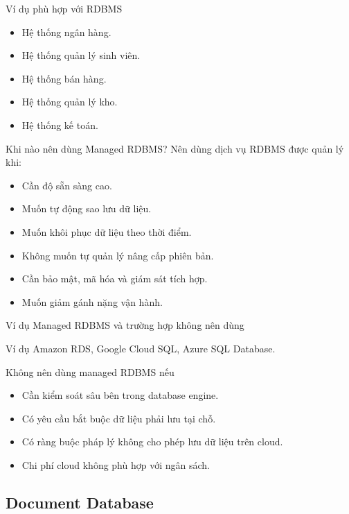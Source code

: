 \documentclass[aspectratio=169,11pt]{beamer}
\newcommand{\smallitem}{\setlength{\itemsep}{2pt}\setlength{\parskip}{0pt}}
\begin{document}
\begin{frame}{Ví dụ phù hợp với RDBMS}
\begin{itemize}
  \smallitem
  \item Hệ thống ngân hàng.
  \item Hệ thống quản lý sinh viên.
  \item Hệ thống bán hàng.
  \item Hệ thống quản lý kho.
  \item Hệ thống kế toán.
\end{itemize}
\end{frame}

\begin{frame}{Khi nào nên dùng Managed RDBMS?}
Nên dùng dịch vụ RDBMS được quản lý khi:
\begin{itemize}
  \smallitem
  \item Cần độ sẵn sàng cao.
  \item Muốn tự động sao lưu dữ liệu.
  \item Muốn khôi phục dữ liệu theo thời điểm.
  \item Không muốn tự quản lý nâng cấp phiên bản.
  \item Cần bảo mật, mã hóa và giám sát tích hợp.
  \item Muốn giảm gánh nặng vận hành.
\end{itemize}
\end{frame}

\begin{frame}{Ví dụ Managed RDBMS và trường hợp không nên dùng}
\begin{block}{Ví dụ}
Amazon RDS, Google Cloud SQL, Azure SQL Database.
\end{block}

\begin{alertblock}{Không nên dùng managed RDBMS nếu}
\begin{itemize}
  \smallitem
  \item Cần kiểm soát sâu bên trong database engine.
  \item Có yêu cầu bắt buộc dữ liệu phải lưu tại chỗ.
  \item Có ràng buộc pháp lý không cho phép lưu dữ liệu trên cloud.
  \item Chi phí cloud không phù hợp với ngân sách.
\end{itemize}
\end{alertblock}
\end{frame}

\subsection{Document Database}
\end{document}
